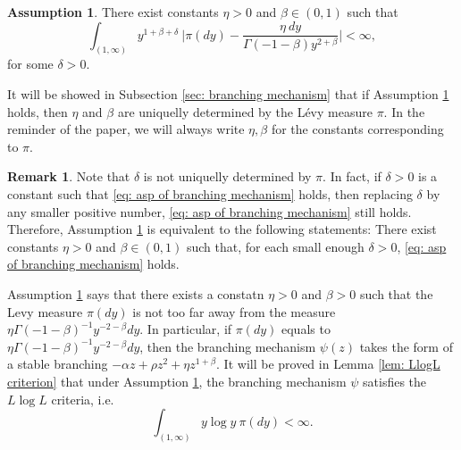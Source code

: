 \documentclass[12pt,a4paper]{amsart}
\theoremstyle{plain}
\theoremstyle{definition}
\newtheorem{rem}[thm]{Remark}
\newtheorem{asp}{Assumption}
\numberwithin{equation}{section}
\begin{document}
\begin{asp}
\label{asp: branching mechanism}
    There exist constants $\eta > 0$ and $\beta \in (0,1)$ such that
\begin{equation}
\label{eq: asp of branching mechanism}
    \int_{(1,\infty)}y^{1+\beta +\delta}~\Big|\pi(dy)-\frac{\eta~dy}{\Gamma(-1-\beta)y^{2+\beta}}\Big| <\infty,
\end{equation}
	for some $\delta > 0$.
\end{asp}

	It will be showed in Subsection \ref{sec: branching mechanism} that if Assumption \ref{asp: branching mechanism} holds, then $\eta$ and $\beta$ are uniquelly determined by the L\'evy measure $\pi$.
	In the reminder of the paper, we will always write $\eta,\beta$ for the constants corresponding to $\pi$.
\begin{rem}
\label{rem: small enough delta}
	Note that $\delta$ is not uniquelly determined by $\pi$. 
	In fact, if $\delta>0$ is a constant such that \eqref{eq: asp of branching mechanism} holds, then replacing $\delta$ by any smaller positive number, \eqref{eq: asp of branching mechanism} still holds.
	Therefore, Assumption \ref{asp: branching mechanism} is equivalent to the following statements: There exist constants $\eta > 0$ and $\beta \in (0,1)$ such that, for each small enough $\delta>0$, \eqref{eq: asp of branching mechanism} holds.
\end{rem}

    Assumption \ref{asp: branching mechanism} says that there exists a constatn $\eta>0$ and $\beta > 0$ such that the Levy measure $\pi(dy)$ is not too far away from the measure $\eta \Gamma(-1-\beta)^{-1}y^{-2-\beta} dy$. 
    In particular, if $\pi(dy)$ equals to $\eta \Gamma(-1-\beta)^{-1}y^{-2-\beta} dy$, then the branching mechanism $\psi(z)$ takes the form of a stable branching
	$-\alpha z + \rho z^2 + \eta z^{1+\beta}$.
	It will be proved in Lemma \ref{lem: LlogL criterion} that under Assumption \ref{asp: branching mechanism}, the branching mechanism $\psi$ satisfies the $L \log L$ criteria, i.e. 
\[
	\int_{(1,\infty)} y\log y~\pi(dy) < \infty.
\]
\end{document}
